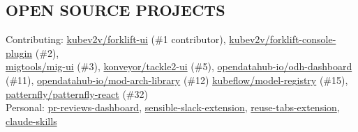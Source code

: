 \documentclass[line,margin]{res}
\begin{document}
\begin{resume}
\section{OPEN SOURCE PROJECTS}
    Contributing: \href{https://github.com/kubev2v/forklift-ui}{kubev2v/forklift-ui} (\#1 contributor), \href{https://github.com/kubev2v/forklift-console-plugin}{kubev2v/forklift-console-plugin} (\#2),\\
    \href{https://github.com/migtools/mig-ui}{migtools/mig-ui} (\#3), \href{https://github.com/konveyor/tackle2-ui}{konveyor/tackle2-ui} (\#5), \href{https://github.com/opendatahub-io/odh-dashboard}{opendatahub-io/odh-dashboard} (\#11),
    \href{https://github.com/opendatahub-io/mod-arch-library}{opendatahub-io/mod-arch-library} (\#12) \href{https://github.com/kubeflow/model-registry}{kubeflow/model-registry} (\#15), \href{https://github.com/patternfly/patternfly-react}{patternfly/patternfly-react} (\#32)\\
    Personal: \href{https://github.com/mturley/pr-reviews-dashboard}{pr-reviews-dashboard}, \href{https://github.com/mturley/sensible-slack-extension}{sensible-slack-extension}, \href{https://github.com/mturley/reuse-tabs-extension}{reuse-tabs-extension}, \href{https://github.com/mturley/claude-skills}{claude-skills}

\end{resume}
\end{document}
